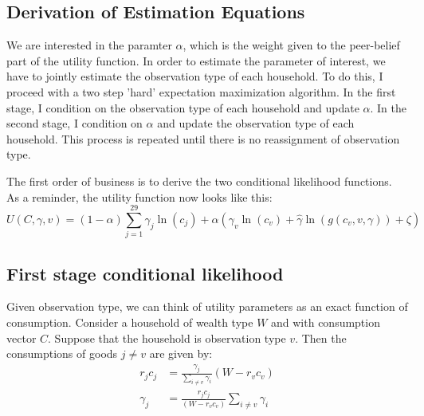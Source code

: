 \documentclass[12pt]{article}
\begin{document}
\subsection{Derivation of Estimation Equations}
We are interested in the paramter $\alpha$, which is the weight given to the peer-belief part of the utility function.  In order to estimate the parameter of interest, we have to jointly estimate the observation type of each household.  To do this, I proceed with a two step 'hard' expectation maximization algorithm.  In the first stage, I condition on the observation type of each household and update $\alpha$.  In the second stage, I condition on $\alpha$ and update the observation type of each household.  This process is repeated until there is no reassignment of observation type.

The first order of business is to derive the two conditional likelihood functions.
As a reminder, the utility function now looks like this:
\begin{equation}
	\label{totuti}
U(C,\gamma,v) = (1-\alpha) \sum_{j=1}^{29}\gamma_j \ln(c_j )  + \alpha \left(\gamma_v \ln(c_v)+ \hat{\gamma}\ln(g(c_v,v,\gamma))  + \zeta \right)
\end{equation}

\subsection{First stage conditional likelihood}

Given observation type, we can think of utility parameters as an exact function of consumption.  Consider a household of wealth type $W$ and with consumption vector $C$.  Suppose that the household is observation type $v$.
Then the consumptions of goods $j\neq v$ are given by:
\begin{align}
	\label{eq:sgd}
	r_jc_j &= \frac{\gamma_j}{\sum_{i\neq v}\gamma_i}  \left(W-  r_v c_v\right)\\
	\label{eq:sgdsol}
	\gamma_j &= \frac{r_j c_j}{\left(W- r_v c_v\right)} \sum_{i\neq v}\gamma_i  
\end{align}
\end{document}
